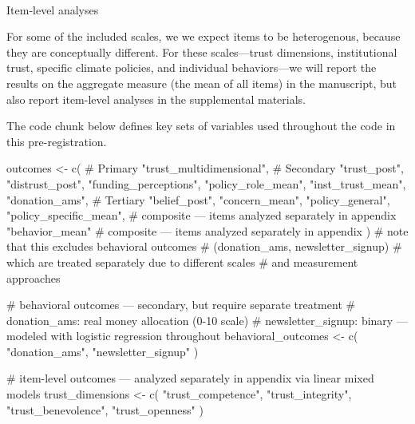 \documentclass[
  letterpaper,
  DIV=11,
  numbers=noendperiod]{scrartcl}
\makeatletter
\let\oldparagraph\paragraph
\renewcommand{\paragraph}{
    \@ifstar
      \xxxParagraphStar
      \xxxParagraphNoStar
  }
\newcommand{\xxxParagraphStar}[1]{\oldparagraph*{#1}\mbox{}}
\newcommand{\xxxParagraphNoStar}[1]{\oldparagraph{#1}\mbox{}}
\newenvironment{Shaded}{\begin{snugshade}}{\end{snugshade}}
\newcommand{\CommentTok}[1]{\textcolor[rgb]{0.37,0.37,0.37}{#1}}
\newcommand{\FunctionTok}[1]{\textcolor[rgb]{0.28,0.35,0.67}{#1}}
\newcommand{\NormalTok}[1]{\textcolor[rgb]{0.00,0.23,0.31}{#1}}
\newcommand{\OtherTok}[1]{\textcolor[rgb]{0.00,0.23,0.31}{#1}}
\newcommand{\StringTok}[1]{\textcolor[rgb]{0.13,0.47,0.30}{#1}}
\makeatother
\begin{document}
\paragraph{Item-level analyses}\label{item-level-analyses}

For some of the included scales, we we expect items to be heterogenous,
because they are conceptually different. For these scales---trust
dimensions, institutional trust, specific climate policies, and
individual behaviors---we will report the results on the aggregate
measure (the mean of all items) in the manuscript, but also report
item-level analyses in the supplemental materials.

The code chunk below defines key sets of variables used throughout the
code in this pre-registration.

\begin{Shaded}
\begin{Highlighting}[]
\NormalTok{outcomes }\OtherTok{\textless{}{-}} \FunctionTok{c}\NormalTok{(}
  \CommentTok{\# Primary}
  \StringTok{"trust\_multidimensional"}\NormalTok{,}
  \CommentTok{\# Secondary}
  \StringTok{"trust\_post"}\NormalTok{,}
  \StringTok{"distrust\_post"}\NormalTok{,}
  \StringTok{"funding\_perceptions"}\NormalTok{,}
  \StringTok{"policy\_role\_mean"}\NormalTok{,}
  \StringTok{"inst\_trust\_mean"}\NormalTok{,}
  \StringTok{"donation\_ams"}\NormalTok{,}
  \CommentTok{\# Tertiary}
  \StringTok{"belief\_post"}\NormalTok{,}
  \StringTok{"concern\_mean"}\NormalTok{,}
  \StringTok{"policy\_general"}\NormalTok{,}
  \StringTok{"policy\_specific\_mean"}\NormalTok{, }\CommentTok{\# composite — items analyzed separately in appendix}
  \StringTok{"behavior\_mean"} \CommentTok{\# composite — items analyzed separately in appendix}
\NormalTok{) }\CommentTok{\# note that this excludes behavioral outcomes}
\CommentTok{\# (donation\_ams, newsletter\_signup)}
\CommentTok{\# which are treated separately due to different scales}
\CommentTok{\# and measurement approaches}

\CommentTok{\# behavioral outcomes — secondary, but require separate treatment}
\CommentTok{\# donation\_ams: real money allocation (0{-}10 scale)}
\CommentTok{\# newsletter\_signup: binary — modeled with logistic regression throughout}
\NormalTok{behavioral\_outcomes }\OtherTok{\textless{}{-}} \FunctionTok{c}\NormalTok{(}
  \StringTok{"donation\_ams"}\NormalTok{,}
  \StringTok{"newsletter\_signup"}
\NormalTok{)}

\CommentTok{\# item{-}level outcomes — analyzed separately in appendix via linear mixed models}
\NormalTok{trust\_dimensions }\OtherTok{\textless{}{-}} \FunctionTok{c}\NormalTok{(}
  \StringTok{"trust\_competence"}\NormalTok{,}
  \StringTok{"trust\_integrity"}\NormalTok{,}
  \StringTok{"trust\_benevolence"}\NormalTok{,}
  \StringTok{"trust\_openness"}
\NormalTok{)}


\end{Highlighting}
\end{Shaded}
\end{document}
